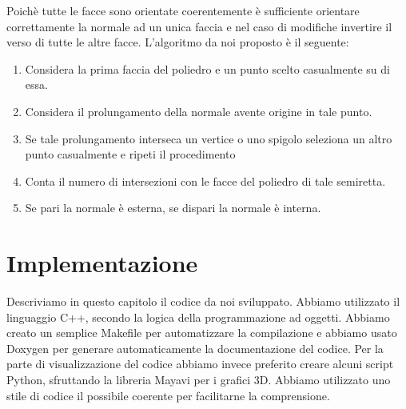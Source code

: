 \documentclass[oneside,12pt]{book}  %
\theoremstyle{plain}
\theoremstyle{definition}
\theoremstyle{remark}
\numberwithin{equation}{chapter} %
\begin{document}
Poich\`e tutte le facce sono orientate coerentemente \`e sufficiente
orientare correttamente la normale ad un unica faccia e nel caso di
modifiche invertire il verso di tutte le altre facce.
L'algoritmo da noi proposto \`e il seguente:
\begin{enumerate}
\item Considera la prima faccia del poliedro e un punto scelto
  casualmente su di essa.
\item Considera il prolungamento della normale avente origine in tale
  punto.
\item Se tale prolungamento interseca un vertice o uno spigolo
  seleziona un altro punto casualmente e ripeti il procedimento
\item Conta il numero di intersezioni con le facce del poliedro di
  tale semiretta.
\item Se pari la normale \`e esterna, se dispari la normale \`e interna.

\end{enumerate}


 

\chapter{Implementazione}
\label{ch:implementazione}

Descriviamo in questo capitolo il codice da noi sviluppato. Abbiamo
utilizzato il linguaggio C++, secondo la logica della programmazione
ad oggetti. Abbiamo creato un semplice Makefile per automatizzare la
compilazione e abbiamo usato Doxygen per generare automaticamente la
documentazione del codice.
Per la parte di visualizzazione del codice abbiamo invece preferito
creare alcuni script Python, sfruttando la libreria Mayavi per i
grafici 3D.
Abbiamo utilizzato uno stile di codice il possibile coerente per
facilitarne la comprensione.
\end{document}
